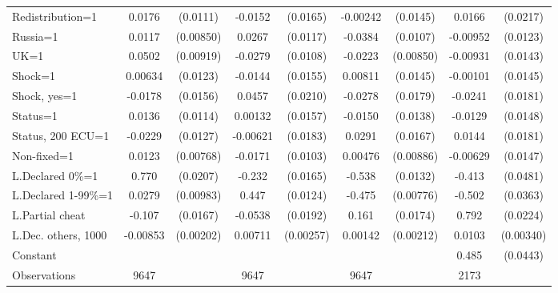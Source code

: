 \begin{tabular}{l|cccccc|cc}
Redistribution=1&   0.0176         & (0.0111)&  -0.0152         & (0.0165)& -0.00242         & (0.0145)&   0.0166         & (0.0217)\\
Russia=1        &   0.0117         &(0.00850)&   0.0267\sym{**} & (0.0117)&  -0.0384\sym{***}& (0.0107)& -0.00952         & (0.0123)\\
UK=1            &   0.0502\sym{***}&(0.00919)&  -0.0279\sym{**} & (0.0108)&  -0.0223\sym{***}&(0.00850)& -0.00931         & (0.0143)\\
Shock=1         &  0.00634         & (0.0123)&  -0.0144         & (0.0155)&  0.00811         & (0.0145)& -0.00101         & (0.0145)\\
Shock, yes=1    &  -0.0178         & (0.0156)&   0.0457\sym{**} & (0.0210)&  -0.0278         & (0.0179)&  -0.0241         & (0.0181)\\
Status=1        &   0.0136         & (0.0114)&  0.00132         & (0.0157)&  -0.0150         & (0.0138)&  -0.0129         & (0.0148)\\
Status, 200 ECU=1&  -0.0229\sym{*}  & (0.0127)& -0.00621         & (0.0183)&   0.0291\sym{*}  & (0.0167)&   0.0144         & (0.0181)\\
Non-fixed=1     &   0.0123         &(0.00768)&  -0.0171\sym{*}  & (0.0103)&  0.00476         &(0.00886)& -0.00629         & (0.0147)\\
L.Declared 0\%=1&    0.770\sym{***}& (0.0207)&   -0.232\sym{***}& (0.0165)&   -0.538\sym{***}& (0.0132)&   -0.413\sym{***}& (0.0481)\\
L.Declared 1-99\%=1&   0.0279\sym{***}&(0.00983)&    0.447\sym{***}& (0.0124)&   -0.475\sym{***}&(0.00776)&   -0.502\sym{***}& (0.0363)\\
L.Partial cheat &   -0.107\sym{***}& (0.0167)&  -0.0538\sym{***}& (0.0192)&    0.161\sym{***}& (0.0174)&    0.792\sym{***}& (0.0224)\\
L.Dec. others, 1000& -0.00853\sym{***}&(0.00202)&  0.00711\sym{***}&(0.00257)&  0.00142         &(0.00212)&   0.0103\sym{***}&(0.00340)\\
Constant        &                  &         &                  &         &                  &         &    0.485\sym{***}& (0.0443)\\
\hline
Observations    &     9647         &         &     9647         &         &     9647         &         &     2173         &         \\


\end{tabular}
